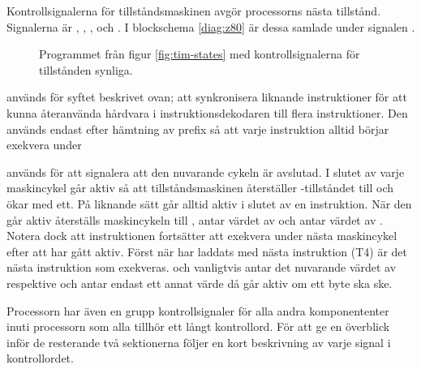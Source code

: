 \documentclass[main.tex]{subfiles}
\begin{document}
Kontrollsignalerna för tillståndsmaskinen avgör processorns nästa tillstånd.
Signalerna är , , ,
 och . I blockschema \ref{diag:z80} är dessa
samlade under signalen .

\begin{figure}[H]
    \center
    
    \caption{Programmet från figur \ref{fig:tim-states} med kontrollsignalerna
    för tillstånden synliga.}
    \label{fig:tim-statectrl}
\end{figure}

 används för syftet beskrivet ovan; att synkronisera liknande
instruktioner för att kunna återanvända hårdvara i instruktionsdekodaren till
flera instruktioner. Den används endast efter hämtning av prefix så att varje
instruktion alltid börjar exekvera under 

 används för att signalera att den nuvarande cykeln är
avslutad. I slutet av varje maskincykel går  aktiv så att
tillståndsmaskinen återställer -tillståndet till  och ökar
 med ett. På liknande sätt går  alltid aktiv i slutet
av en instruktion. När den går aktiv återställs maskincykeln till ,
 antar värdet av  och  antar värdet av
. Notera dock att instruktionen fortsätter att exekvera under
nästa maskincykel efter att  har gått aktiv. Först när
 har laddats med nästa instruktion (T4) är det nästa instruktion som
exekveras.  och  vanligtvis antar det nuvarande
värdet av  respektive  och antar endast ett annat värde då
 går aktiv om ett byte ska ske.

Processorn har även en grupp kontrollsignaler för alla andra komponententer
inuti processorn som alla tillhör ett långt kontrollord. För att ge en
överblick inför de resterande två sektionerna följer en kort beskrivning av
varje signal i kontrollordet.
\end{document}
